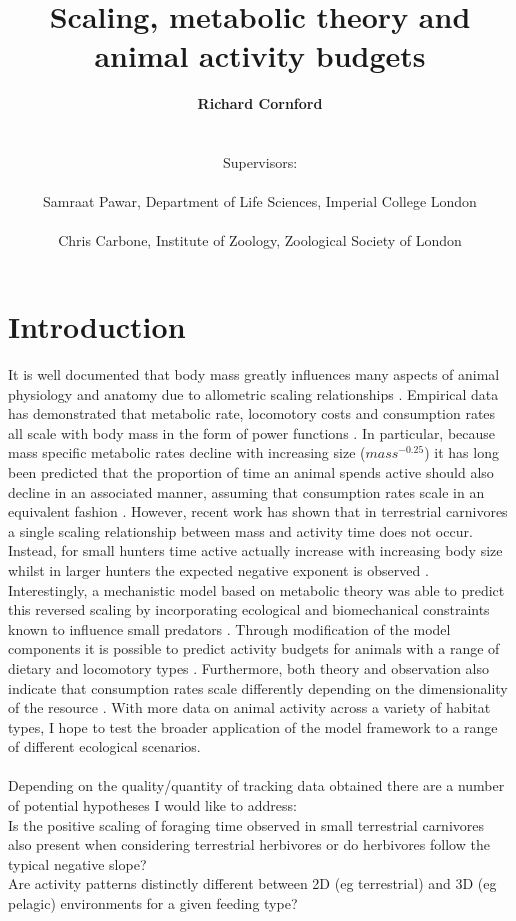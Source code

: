 \documentclass[11pt]{article}
\title{\textbf{Scaling, metabolic theory and animal activity budgets}}
\author{\textbf{Richard Cornford} 
		\\
		\\
		\\
		Supervisors:
		\\
		\\
		Samraat Pawar, Department of Life Sciences, Imperial College London
		\\
		\\
		Chris Carbone, Institute of Zoology, Zoological Society of London}
\begin{document}
\maketitle

\pagebreak 
\linenumbers
\onehalfspacing

\section*{Introduction}
It is well documented that body mass greatly influences many aspects of animal physiology and anatomy due to allometric scaling relationships \citep{randall2002eckert, schmidt1984scaling, peters1986ecological}. Empirical data has demonstrated that metabolic rate, locomotory costs and consumption rates all scale with body mass in the form of power functions \citep{schmidt1984scaling, kleiber1932body, taylor1982energetics, shipley1994scaling, pawar2012dimensionality}. In particular, because mass specific metabolic rates decline with increasing size (\begin{math}mass^{-0.25}\end{math}) it has long been predicted that the proportion of time an animal spends active should also decline in an associated manner, assuming that consumption rates scale in an equivalent fashion \citep{peters1986ecological, rizzutoinpress}. However, recent work has shown that in terrestrial carnivores a single scaling relationship between mass and activity time does not occur. Instead, for small hunters time active actually increase with increasing body size whilst in larger hunters the expected negative exponent is observed \citep{rizzutoinpress}. Interestingly, a mechanistic model based on metabolic theory was able to predict this reversed scaling by incorporating ecological and biomechanical constraints known to influence small predators \citep{rizzutoinpress}. Through modification of the model components it is possible to predict activity budgets for animals with a range of dietary and locomotory types \citep{rizzutoinpress, pawar2012dimensionality}. Furthermore, both theory and observation also indicate that consumption rates scale differently depending on the dimensionality of the resource \citep{pawar2012dimensionality}. With more data on animal activity across a variety of habitat types, I hope to test the broader application of the model framework to a range of different ecological scenarios.
\\
\\
Depending on the quality/quantity of tracking data obtained there are a number of potential hypotheses I would like to address:
\\
Is the positive scaling of foraging time observed in small terrestrial carnivores also present when considering terrestrial herbivores or do herbivores follow the typical negative slope?
\\
Are activity patterns distinctly different between 2D (eg terrestrial) and 3D (eg pelagic) environments for a given feeding type?
\end{document}
